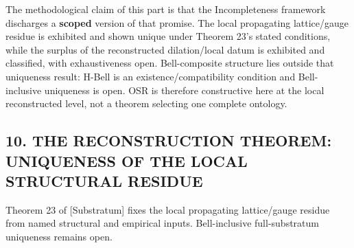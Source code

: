 \documentclass[
]{article}
\begin{document}
The methodological claim of this part is that the Incompleteness
framework discharges a \textbf{scoped} version of that promise. The
local propagating lattice/gauge residue is exhibited and shown unique
under Theorem 23's stated conditions, while the surplus of the
reconstructed dilation/local datum is exhibited and classified, with
exhaustiveness open. Bell-composite structure lies outside that
uniqueness result: H-Bell is an existence/compatibility condition and
Bell-inclusive uniqueness is open. OSR is therefore constructive here at
the local reconstructed level, not a theorem selecting one complete
ontology.

\hypertarget{the-reconstruction-theorem-uniqueness-of-the-local-structural-residue}{%
\subsection{10. THE RECONSTRUCTION THEOREM: UNIQUENESS OF THE LOCAL
STRUCTURAL
RESIDUE}\label{the-reconstruction-theorem-uniqueness-of-the-local-structural-residue}}

Theorem 23 of {[}Substratum{]} fixes the local propagating lattice/gauge
residue from named structural and empirical inputs. Bell-inclusive
full-substratum uniqueness remains open.
\end{document}
